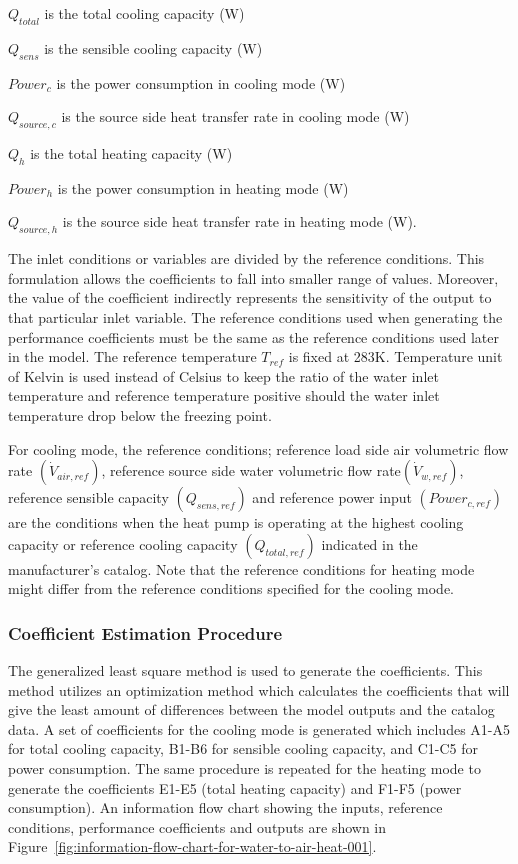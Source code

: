 \({{Q_{total}}}\) is the total cooling capacity (W)

\({{Q_{sens}}}\) is the sensible cooling capacity (W)

\({Powe{r_c}}\) is the power consumption in cooling mode (W)

\({{Q_{source,c}}}\) is the source side heat transfer rate in cooling mode (W)

\({{Q_{h}}}\) is the total heating capacity (W)

\({Powe{r_h}}\) is the power consumption in heating mode (W)

\({{Q_{source,h}}}\) is the source side heat transfer rate  in heating mode (W).

The inlet conditions or variables are divided by the reference conditions. This formulation allows the coefficients to fall into smaller range of values. Moreover, the value of the coefficient indirectly represents the sensitivity of the output to that particular inlet variable. The reference conditions used when generating the performance coefficients must be the same as the reference conditions used later in the model. The reference temperature \({{T_{ref}}}\) is fixed at 283K. Temperature unit of Kelvin is used instead of Celsius to keep the ratio of the water inlet temperature and reference temperature positive should the water inlet temperature drop below the freezing point.

For cooling mode, the reference conditions; reference load side air volumetric flow rate \(\left( {{{\dot V}_{air,ref}}} \right)\), reference source side water volumetric flow rate\(\left( {{{\dot V}_{w,ref}}} \right)\), reference sensible capacity \(\left( {{Q_{sens,ref}}} \right)\) and reference power input \(\left( {Powe{r_{c,ref}}} \right)\) are the conditions when the heat pump is operating at the highest cooling capacity or reference cooling capacity \(\left( {{Q_{total,ref}}} \right)\) indicated in the manufacturer's catalog. Note that the reference conditions for heating mode might differ from the reference conditions specified for the cooling mode.

\subsubsection{Coefficient Estimation Procedure}\label{coefficient-estimation-procedure-000}

The generalized least square method is used to generate the coefficients. This method utilizes an optimization method which calculates the coefficients that will give the least amount of differences between the model outputs and the catalog data. A set of coefficients for the cooling mode is generated which includes A1-A5 for total cooling capacity, B1-B6 for sensible cooling capacity, and C1-C5 for power consumption. The same procedure is repeated for the heating mode to generate the coefficients E1-E5 (total heating capacity) and F1-F5 (power consumption). An information flow chart showing the inputs, reference conditions, performance coefficients and outputs are shown in Figure~\ref{fig:information-flow-chart-for-water-to-air-heat-001}.


